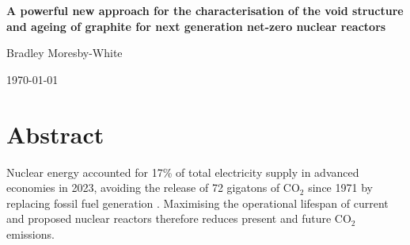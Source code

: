 \documentclass[12pt,a4paper]{report}
\begin{document}
\begin{titlepage}
    \centering
    \vspace*{2cm}
    {\LARGE\bfseries
    A powerful new approach for the characterisation of the void structure and ageing of graphite for next generation net-zero nuclear reactors\par}
    \vspace{2cm}
    {\Large Bradley Moresby-White\par}
    \vspace{1cm}
    {\large \today\par}
    \vfill
\end{titlepage}

\tableofcontents
\clearpage

\chapter{Abstract}

Nuclear energy accounted for 17\% of total electricity supply in advanced economies in 2023, avoiding the release of 72 gigatons of CO$_2$ since 1971 by replacing fossil fuel generation \citep{IEA2025_NewEraNuclear}. Maximising the operational lifespan of current and proposed nuclear reactors therefore reduces present and future CO$_2$ emissions.
\end{document}
